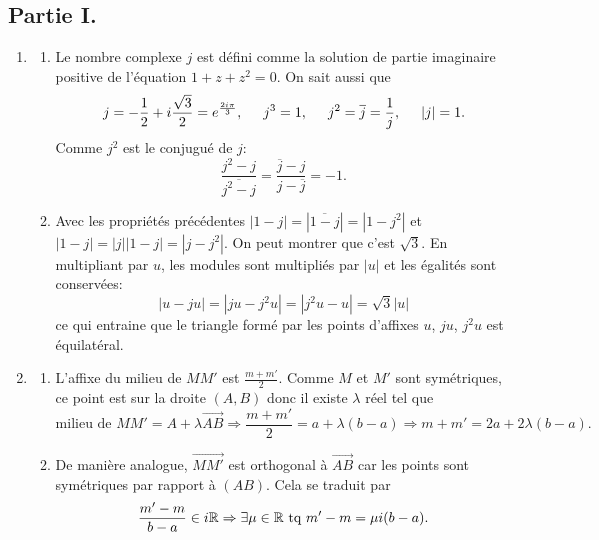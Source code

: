 \subsection*{Partie I.}
\begin{enumerate}
 \item
 \begin{enumerate}
   \item Le nombre complexe $j$ est défini comme la solution de partie imaginaire positive de l'équation $1 + z + z^2=0$. On sait aussi que
\[
  j = -\frac{1}{2} + i \frac{\sqrt{3}}{2} = e^{\frac{2i \pi}{3}},\hspace{0.5cm} j^3 = 1, \hspace{0.5cm} j^2 = \overline{j} = \frac{1}{j}, \hspace{0.5cm} |j| = 1.
\]
Comme $j^2$ est le conjugué de $j$:
\[
\frac{j^2 - j}{\overline{j^2 - j}} = \frac{\overline{j} - j}{j - \overline{j}} = -1.
\]
   \item  Avec les propriétés précédentes $|1-j| = |\overline{1-j}| = |1 - j^2|$ et $|1-j| = |j||1-j| = |j-j^2|$. On peut montrer que c'est $\sqrt{3}$.\newline
En multipliant par $u$, les modules sont multipliés par $|u|$ et les égalités sont conservées:
\begin{displaymath}
 |u-ju| = |ju-j^2u|=|j^2u -u|=\sqrt{3}|u|
\end{displaymath}
ce qui entraine que le triangle formé par les points d'affixes $u$, $ju$, $j^2u$ est équilatéral.

 \end{enumerate}

 \item
 \begin{enumerate}
   \item L'affixe du milieu de $M M'$ est $\frac{m + m'}{2}$. Comme $M$ et $M'$ sont symétriques, ce point est sur la droite $(A,B)$ donc il existe $\lambda$ réel tel que
\[
  \text{milieu de } MM' = A + \lambda \overrightarrow{AB} \Rightarrow
  \frac{m + m'}{2} = a + \lambda(b-a) \Rightarrow m + m' = 2a + 2 \lambda(b-a).
\]

   \item De manière analogue, $\overrightarrow{M M'}$ est orthogonal à $\overrightarrow{AB}$ car les points sont symétriques par rapport à $(AB)$. Cela se traduit par 
\[
  \frac{m' - m}{b-a} \in i \mathbb{R} \Rightarrow \exists \mu \in \mathbb{R} \text{ tq } m' - m = \mu i(b-a).
\]


\end{enumerate}
\end{enumerate}
